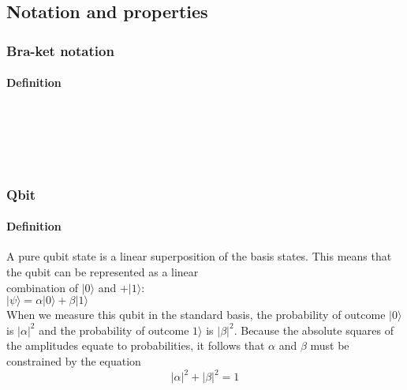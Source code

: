 \subsection{Notation and properties}
\begin{frame}
	\frametitle{Bra-ket notation}
		\framesubtitle{Definition}
		\vspace{-1cm}
	{\normalsize
	\\
	\vspace{0.4cm}
	\\
	\\
	\hspace{0.5cm}{}\\

	}
\end{frame}

\begin{frame}
	\frametitle{Qbit}
		\framesubtitle{Definition}
		\vspace{-1cm}
	{\normalsize
	A pure qubit state is a linear superposition of the basis states. This means that the qubit can be represented as a linear\\ combination of $|0\rangle$ and +$|1\rangle $:\\ 
    $|\psi \rangle =\alpha |0\rangle +\beta |1\rangle$\\
  
    When we measure this qubit in the standard basis, the probability of outcome $|0\rangle$  is $|\alpha |^{2}$ and the probability of outcome $1\rangle$  is $|\beta |^{2}$. Because the absolute squares of the amplitudes equate to probabilities, it follows that
     $\alpha$ and $\beta$ must be constrained by the equation
$$|\alpha |^{2}+|\beta |^{2}=1$$\\
	}
\end{frame}

